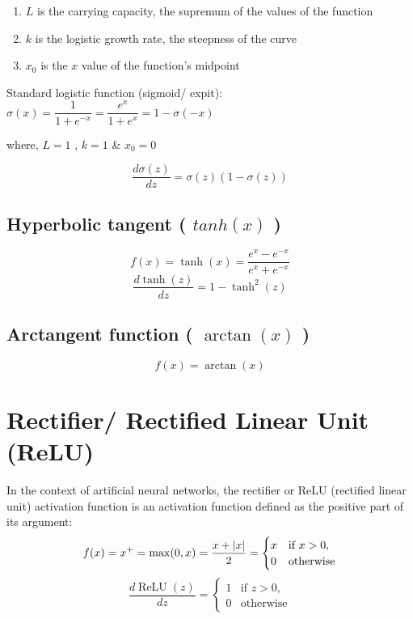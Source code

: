 \vspace{0.2cm}

\begin{enumerate}
    \item $L$ is the carrying capacity, the supremum of the values of the function
    \item $k$ is the logistic growth rate, the steepness of the curve
    \item $x_{0}$ is the $x$ value of the function's midpoint
\end{enumerate}

\vspace{0.2cm}
\noindent Standard logistic function (sigmoid/ expit):\label{sigmoid}
\(
\sigma(x) = {\displaystyle\dfrac{1}{1+e^{-x}}} = {\displaystyle\dfrac{e^{x}}{1+e^{x}}} = 1- \sigma(-x)
\)

where, $L=1$ , $k=1$ \& $x_{0}=0$


\[
    \displaystyle\dfrac{d\sigma(z)}{dz} = \sigma(z)(1 - \sigma(z))
\]


\subsection{Hyperbolic tangent ( $tanh(x)$ ) \cite{wiki-Sigmoid_function,wiki-Hyperbolic_functions}}\label{Hyperbolic tangent}

\[
    f(x)=\tanh(x)={\displaystyle\frac {e^{x}-e^{-x}}{e^{x}+e^{-x}}}
\]
\[
    \displaystyle\dfrac{d\tanh(z)}{dz} = 1-\tanh^2(z)
\]


\subsection{Arctangent function ( $\arctan(x)$ ) \cite{wiki-Inverse_trigonometric_functions}}
\[
    f(x)=\arctan(x)
\]


\section{Rectifier/ Rectified Linear Unit (ReLU) \cite{wiki-Rectifier}}\label{ReLU}
In the context of artificial neural networks, the rectifier or ReLU (rectified linear unit) activation function is an activation function defined as the positive part of its argument:
\[
    f(x)=x^{+}=\max(0,x)={\displaystyle\frac {x+\left| x \right|}{2}}={\begin{cases}x&{\text{if }}x>0,\\0&{\text{otherwise}}\end{cases}}
\]
\[
    \displaystyle\dfrac{d\operatorname{ReLU}(z)}{dz}={\begin{cases}1&{\text{if }}z>0,\\0&{\text{otherwise}}\end{cases}}
\]

